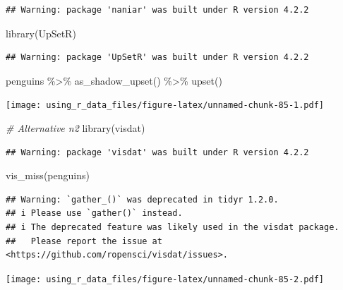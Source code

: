 \documentclass[
]{book}
\newenvironment{Shaded}{\begin{snugshade}}{\end{snugshade}}
\newcommand{\CommentTok}[1]{\textcolor[rgb]{0.56,0.35,0.01}{\textit{#1}}}
\newcommand{\FunctionTok}[1]{\textcolor[rgb]{0.00,0.00,0.00}{#1}}
\newcommand{\NormalTok}[1]{#1}
\newcommand{\SpecialCharTok}[1]{\textcolor[rgb]{0.00,0.00,0.00}{#1}}
\begin{document}
\begin{verbatim}
## Warning: package 'naniar' was built under R version 4.2.2
\end{verbatim}

\begin{Shaded}
\begin{Highlighting}[]
\FunctionTok{library}\NormalTok{(UpSetR)}
\end{Highlighting}
\end{Shaded}

\begin{verbatim}
## Warning: package 'UpSetR' was built under R version 4.2.2
\end{verbatim}

\begin{Shaded}
\begin{Highlighting}[]
\NormalTok{penguins }\SpecialCharTok{\%\textgreater{}\%} 
  \FunctionTok{as\_shadow\_upset}\NormalTok{() }\SpecialCharTok{\%\textgreater{}\%} 
  \FunctionTok{upset}\NormalTok{()}
\end{Highlighting}
\end{Shaded}

\texttt{[image: using\_r\_data\_files/figure-latex/unnamed-chunk-85-1.pdf]}

\begin{Shaded}
\begin{Highlighting}[]
\CommentTok{\# Alternative n2}
\FunctionTok{library}\NormalTok{(visdat)}
\end{Highlighting}
\end{Shaded}

\begin{verbatim}
## Warning: package 'visdat' was built under R version 4.2.2
\end{verbatim}

\begin{Shaded}
\begin{Highlighting}[]
\FunctionTok{vis\_miss}\NormalTok{(penguins)}
\end{Highlighting}
\end{Shaded}

\begin{verbatim}
## Warning: `gather_()` was deprecated in tidyr 1.2.0.
## i Please use `gather()` instead.
## i The deprecated feature was likely used in the visdat package.
##   Please report the issue at <https://github.com/ropensci/visdat/issues>.
\end{verbatim}

\texttt{[image: using\_r\_data\_files/figure-latex/unnamed-chunk-85-2.pdf]}
\end{document}
